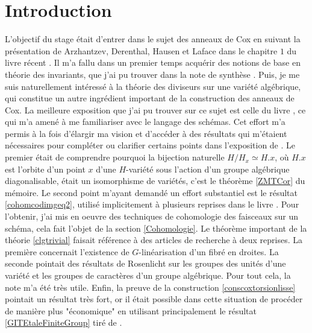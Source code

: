 
\section*{Introduction}

L'objectif du stage était d'entrer dans le sujet des anneaux de Cox en suivant la présentation de Arzhantzev, Derenthal, Hausen et Laface dans le chapitre $1$ du livre récent \cite{coxrings}. Il m'a fallu dans un premier temps acquérir des notions de base en théorie des invariants, que j'ai pu trouver dans la note de synthèse \cite{LAGBrion}. Puis, je me suis naturellement intéressé à la théorie des diviseurs sur une variété algébrique, qui constitue un autre ingrédient important de la construction des anneaux de Cox. La meilleure exposition que j'ai pu trouver sur ce sujet est celle du livre \cite{Hartshorne}, ce qui m'a amené à me familiariser avec le langage des schémas. Cet effort m'a permis à la fois d'élargir ma vision et d'accéder à des résultats qui m'étaient nécessaires pour compléter ou clarifier certains points dans l'exposition de \cite{coxrings}. Le premier était de comprendre pourquoi la bijection naturelle $H/H_x\simeq H.x$, où $H.x$ est l'orbite d'un point $x$ d'une $H$-variété sous l'action d'un groupe algébrique diagonalisable, était un isomorphisme de variétés, c'est le théorème \ref{ZMTCor} du mémoire. Le second point m'ayant demandé un effort substantiel est le résultat \ref{cohomcodimgeq2}, utilisé implicitement à plusieurs reprises dans le livre \cite{coxrings}. Pour l'obtenir, j'ai mis en oeuvre des techniques de cohomologie des faisceaux sur un schéma, cela fait l'objet de la section \ref{Cohomologie}. Le théorème important de la théorie \ref{clgtrivial} faisait référence à des articles de recherche à deux reprises. La première concernait l'existence de $G$-linéarisation d'un fibré en droites. La seconde pointait des résultats de Rosenlicht sur les groupes des unités d'une variété et les groupes de caractères d'un groupe algébrique. Pour tout cela, la note \cite{LinearizationGBrion} m'a été très utile. Enfin, la preuve de la construction \ref{conscoxtorsionlisse} pointait un résultat très fort, or il était possible dans cette situation de procéder de manière plus "économique" en utilisant principalement le résultat \ref{GITEtaleFiniteGroup} tiré de \cite{MumfordAbelianVarieties}.

